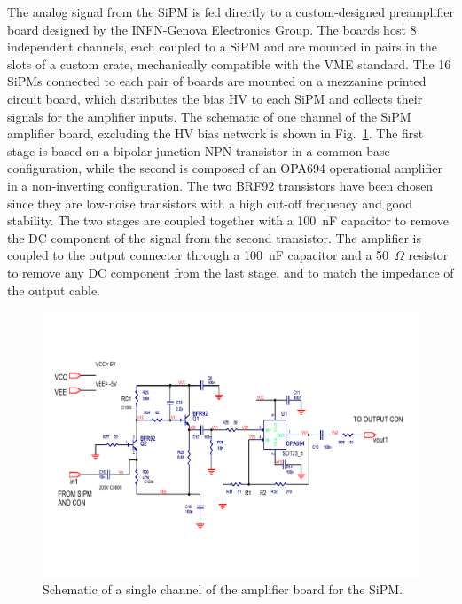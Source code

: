 The analog signal from the SiPM is fed directly to a custom-designed preamplifier board designed by the
INFN-Genova Electronics Group. The boards host 8 independent channels, each coupled to a SiPM and are mounted
in pairs in the slots of a custom crate, mechanically compatible with the VME standard. The 16 SiPMs connected to
each pair of boards are mounted on a mezzanine printed circuit board, which distributes the bias HV to each SiPM
and collects their signals for the amplifier inputs. The schematic of one channel of the SiPM amplifier board,
excluding the HV bias network is shown in Fig.~\ref{Fig:FTHODOAmpBoard}. The first stage is based on a bipolar
junction NPN transistor in a common base configuration, while the second is composed of an OPA694 operational
amplifier in a non-inverting configuration. The two BRF92 transistors have been chosen since they are low-noise
transistors with a high cut-off frequency and good stability. The two stages are coupled together with a 100~nF
capacitor to remove the DC component of the signal from the second transistor. The amplifier is coupled to the
output connector through a 100~nF capacitor and a 50~$\Omega$ resistor to remove any DC component from the
last stage, and to match the impedance of the output cable. 

\begin{figure}[th!]
\centering 
\includegraphics[width=1.0\columnwidth]{./fig/FTHODOAmpBoard.pdf} 
\caption{Schematic of a single channel of the amplifier board for the SiPM.} 
\label{Fig:FTHODOAmpBoard} 
\end{figure}

